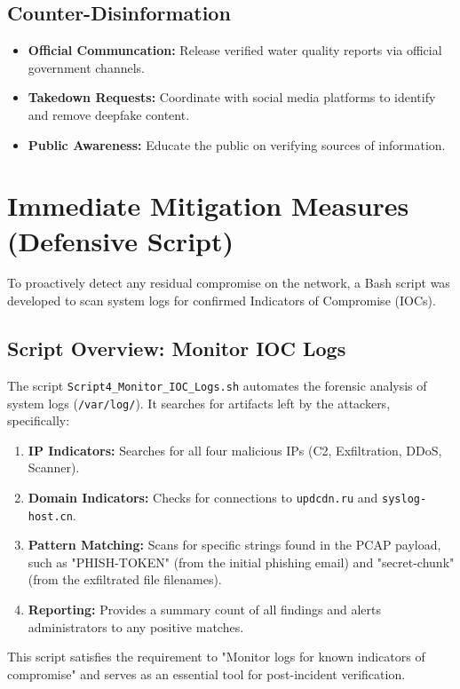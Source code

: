 \documentclass[12pt,a4paper]{article}
\begin{document}
\subsection{Counter-Disinformation}
\begin{itemize}
    \item \textbf{Official Communcation:} Release verified water quality reports via official government channels.
    \item \textbf{Takedown Requests:} Coordinate with social media platforms to identify and remove deepfake content.
    \item \textbf{Public Awareness:} Educate the public on verifying sources of information.
\end{itemize}

\section{Immediate Mitigation Measures (Defensive Script)}
To proactively detect any residual compromise on the network, a Bash script was developed to scan system logs for confirmed Indicators of Compromise (IOCs).

\subsection{Script Overview: Monitor IOC Logs}
The script \texttt{Script4\_Monitor\_IOC\_Logs.sh} automates the forensic analysis of system logs (\texttt{/var/log/}). It searches for artifacts left by the attackers, specifically:
\begin{enumerate}
    \item \textbf{IP Indicators:} Searches for all four malicious IPs (C2, Exfiltration, DDoS, Scanner).
    \item \textbf{Domain Indicators:} Checks for connections to \texttt{updcdn.ru} and \texttt{syslog-host.cn}.
    \item \textbf{Pattern Matching:} Scans for specific strings found in the PCAP payload, such as "PHISH-TOKEN" (from the initial phishing email) and "secret-chunk" (from the exfiltrated file filenames).
    \item \textbf{Reporting:} Provides a summary count of all findings and alerts administrators to any positive matches.
\end{enumerate}

This script satisfies the requirement to "Monitor logs for known indicators of compromise" and serves as an essential tool for post-incident verification.
\end{document}

